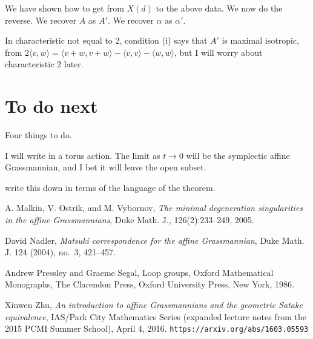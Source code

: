 {\bpf
We have shown how to get from $X(d)$ to the above data.  We now do the reverse.
We recover $A$ as $A'$.  We recover $\alpha$ as $\alpha'$.  \epf

 In characteristic not equal to 2, condition (i) says
that $A'$ is maximal isotropic, from
$2 \langle v,w \rangle = \langle v+w,v+w \rangle - \langle v,v \rangle
- \langle w,w \rangle$, but I will worry about characteristic 2 later.


\section{To do next}

Four things to do.

I will write in a torus action.
The limit as $t \rightarrow 0$ will be the symplectic affine Grassmannian,
and I bet it will leave the open subset.

write this down in terms of the language of the theorem.








}  %


\begin{thebibliography}{[HPLqjm]}


 A. Malkin, V. Ostrik, and M. Vybornov, {\em  The minimal degeneration singularities in the affine Grassmannians}, Duke Math. J., 126(2):233–249,
2005.

 David Nadler, {\em Matsuki correspondence for the affine Grassmannian}, Duke Math. J. 124 (2004), no.\ 3,
421–457.

Andrew Pressley and Graeme Segal, Loop groups, Oxford Mathematical Monographs, The Clarendon Press, Oxford University Press, New York, 1986. 

 Xinwen Zhu, {\em An introduction to affine Grassmannians and the geometric Satake equivalence}, IAS/Park City Mathematics Series (expanded lecture notes from the 2015 PCMI Summer School), April 4, 2016.  \verb+https://arxiv.org/abs/1603.05593+
\end{thebibliography}


